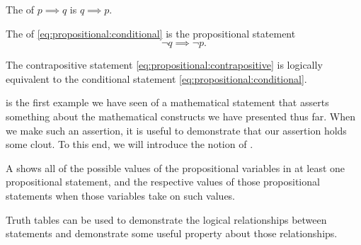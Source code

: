 \begin{defn}[converse]
  The  of \(p \implies q\) is \(q \implies p\).
\end{defn}

\begin{defn}[contrapositive]
  The  of
  \eqref{eq:propositional:conditional}
  is the propositional statement
  \begin{equation}
    \neg q \implies \neg p.
    \label{eq:propositional:contrapositive}
  \end{equation}
  \label{def:contrapositive}
\end{defn}

\begin{theorem}
  The contrapositive statement
  \eqref{eq:propositional:contrapositive}
  is logically equivalent to the conditional statement
  \eqref{eq:propositional:conditional}.
  \label{thm:contrapositive-conditional}
\end{theorem}

 is the first example we have seen
of a mathematical statement that asserts something about the mathematical
constructs we have presented thus far.
When we make such an assertion, it is useful to demonstrate that our assertion
holds some clout.
To this end, we will introduce the notion of .

\begin{defn}
  A  shows all of the possible values
  of the propositional variables in at least one propositional statement,
  and the respective values of those propositional statements when those
  variables take on such values.

  Truth tables can be used to demonstrate the logical relationships between
  statements and demonstrate some useful property about those relationships.
\end{defn}

